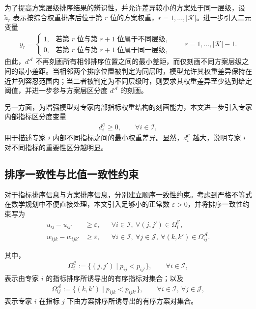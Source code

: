 \documentclass{article}
\begin{document}
为了提高方案层级排序结果的辨识性，并允许差异较小的方案处于同一层级，设 $\tilde a_r$ 表示按综合权重排序后位于第 $r$ 位的方案权重，$r=1,\dots,|\mathcal K|$。进一步引入二元变量
\begin{align}
    y_r=
    \begin{cases}
        1, & \text{若第 } r \text{ 位与第 } r+1 \text{ 位属于不同层级},\\
        0, & \text{若第 } r \text{ 位与第 } r+1 \text{ 位属于同一层级},
    \end{cases}
    \qquad r=1,\dots,|\mathcal K|-1.
\end{align}
由此，$d^{\mathcal A}$ 不再刻画所有相邻排序位置之间的最小差距，而仅刻画不同方案层级之间的最小差距。当相邻两个排序位置被判定为同层时，模型允许其权重差异保持在近并列容忍范围内；当二者被判定为不同层级时，则要求其权重差异至少达到给定阈值，并进一步参与方案层区分度 $d^{\mathcal A}$ 的刻画。

另一方面，为增强模型对专家内部指标权重结构的刻画能力，本文进一步引入专家内部指标区分度变量
\begin{align}
    d_i^{\mathcal C}\ge 0,
    \qquad \forall i\in\mathcal I,
\end{align}
用于描述专家 $i$ 内部不同指标之间的最小权重差异。显然，$d_i^{\mathcal C}$ 越大，说明专家 $i$ 对不同指标的重要性区分越明显。

\subsection{排序一致性与比值一致性约束}

对于指标排序信息与方案排序信息，分别建立顺序一致性约束。考虑到严格不等式在数学规划中不便直接处理，本文引入足够小的正常数 $\varepsilon>0$，并将排序一致性约束写为
\begin{align}
    u_{ij}-u_{ij'} &\ge \varepsilon,
    && \forall i\in\mathcal I,\ \forall (j,j')\in\Omega_i^{\mathcal C}, \\
    w_{ijk}-w_{ijk'} &\ge \varepsilon,
    && \forall i\in\mathcal I,\ \forall j\in\mathcal J,\ \forall (k,k')\in\Omega_{ij}^{\mathcal A}.
\end{align}

其中，
\begin{align}
    \Omega_i^{\mathcal C}
    := \{(j,j')\mid p_{ij}<p_{ij'}\},
    \qquad \forall i\in\mathcal I,
\end{align}
表示由专家 $i$ 的指标排序所诱导出的有序指标对集合；以及
\begin{align}
    \Omega_{ij}^{\mathcal A}
    := \{(k,k')\mid p_{ijk}<p_{ijk'}\},
    \qquad \forall i\in\mathcal I,\ \forall j\in\mathcal J,
\end{align}
表示专家 $i$ 在指标 $j$ 下由方案排序所诱导出的有序方案对集合。
\end{document}
